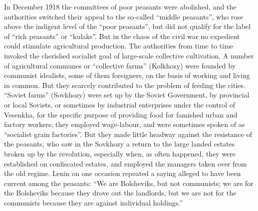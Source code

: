 In December 1918 the committees of poor peasants were abolished, and the authorities switched their appeal to the so-called ``middle peasants'', who rose above the indigent level of the ``poor peasants'', but did not qualify for the label of ``rich peasants'' or ``kulaks''. But in the chaos of the civil war no expedient could stimulate agricultural production. The authorities from time to time invoked the cherished socialist goal of large-scale collective cultivation. A number of agricultural communes or ``collective farms'' (Kolkhozy) were founded by communist idealists, some of them foreigners, on the basis of working and living in common. But they scarcely contributed to the problem of feeding the cities. ``Soviet farms'' (Sovkhozy) were set up by the Soviet Government, by provincial or local Soviets, or sometimes by industrial enterprises under the control of Vesenkha, for the specific purpose of providing food for famished urban and factory workers; they employed wage-labour, and were sometimes spoken of as ``socialist grain factories''. But they made little headway against the resistance of the peasants, who saw in the Sovkhozy a return to the large landed estates broken up by the revolution, especially when, as often happened, they were established on confiscated estates, and employed the managers taken over from the old regime. Lenin on one occasion repeated a saying alleged to have been current among the peasants: ``We are Bolsheviks, but not communists; we are for the Bolsheviks because they drove out the landlords, but we are not for the communists because they are against individual holdings.'' 

